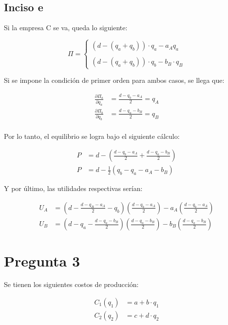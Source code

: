 \documentclass[
	spanish, %
	letterpaper, oneside
]{article}
\begin{document}
\subsection{Inciso e}

Si la empresa C se va, queda lo siguiente:

$$\Pi=\begin{cases}
(d-(q_a+q_b))\cdot q_a - a_A q_a\\\\
(d-(q_a+q_b))\cdot q_b - b_B\cdot q_B
\end{cases}$$

Si se impone la condición de primer orden para ambos casos, se llega que:

\begin{align*}
	\frac{\partial\Pi_a}{\partial q_a} &= \frac{d-q_b-a_A}{2}=q_A\\
	\frac{\partial\Pi_b}{\partial q_b} &= \frac{d-q_a-b_B}{2}=q_B
\end{align*}\\

Por lo tanto, el equilibrio se logra bajo el siguiente cálculo:

\begin{align*}
	P &= d-(\frac{d-q_b-a_A}{2}+\frac{d-q_a-b_B}{2})\\
	P &= d-\frac{1}{2}(q_b - q_a - a_A - b_B)
\end{align*}

Y por último, las utilidades respectivas serían:

\begin{align*}
	U_A &= (d-\frac{d-q_B-a_A}{2}-q_b)(\frac{d-q_b-a_A}{2})-a_A(\frac{d-q_b-a_A}{2})\\
	U_B &= (d-q_a - \frac{d-q_a-b_B}{2})(\frac{d-q_a-b_B}{2})-b_B(\frac{d-q_a-b_B}{2})
\end{align*}







\section{Pregunta 3}\label{sec:pregunta-3}

Se tienen los siguientes costos de producción:

	\begin{align*}
		  C_1(q_1) &= a + b \cdot q_1\\
		  C_2(q_2) &= c + d \cdot q_2
	\end{align*}\\
\end{document}

